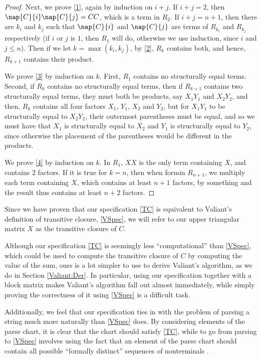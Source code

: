 \begin{proof}
Next, we prove \ref{1}, again by induction on $i + j$. If $i + j = 2$, then $\nap{C}{i}\nap{C}{j} = CC$, which is a term in $R_2$. If $i + j = n + 1$, then there are $k_i$ and $k_j$ such that $\nap{C}{i}$ and $\nap{C}{j}$ are terms of $R_{k_i}$ and $R_{k_j}$ respectively (if $i$ or $j$ is $1$, then $R_1$ will do, otherwise we use induction, since $i$ and $j \le n$). Then if we let $k = \max(k_i,k_j)$, by \ref{2}, $R_k$ contains both, and hence, $R_{k+1}$ contains their product. 

We prove \ref{3} by induction on $k$. First, $R_1$ contains no structurally equal terms. Second, if $R_k$ contains no structurally equal terms, then if $R_{k+1}$ contains two structurally equal terms, they must both be products, say $X_1Y_1$ and $X_2Y_2$, and then, $R_{k}$ contains all four factors $X_1$, $Y_1$, $X_2$ and $Y_2$, but for $X_1Y_1$ to be structurally equal to $X_2Y_2$, their outermost parentheses must be equal, and so we must have that $X_1$ is structurally equal to $X_2$ and $Y_1$ is structurally equal to $Y_2$, since otherwise the placement of the parentheses would be different in the products. 

We prove \ref{4} by induction on $k$. In $R_1$, $XX$ is the only term containing $X$, and contains $2$ factors. If it is true for $k = n$, then when formin $R_{n+1}$, we multiply each term containing $X$, which contains at least $n + 1$ factors, by something and the result thus contains at least $n+2$ factors.
\end{proof}

Since we have proven that our specification \eqref{TC} is equivalent to Valiant's definition of transitive closure, \eqref{VSpec}, we will refer to our upper triangular matrix $X$ as the transitive closure of $C$. 

Although our specification \eqref{TC} is seemingly less ``computational'' than 
\eqref{VSpec}, which could be used to compute the transitive closure of $C$ by computing the value of the sum, ours is a lot simpler to use to derive Valiant's algorithm, as we do in Section \ref{Valiant:Der}. In particular, using our specification together with a block matrix makes Valiant's algorithm fall out almost immediately, while simply proving the correctness of it using \eqref{VSpec} is a difficult task.

Additionally, we feel that our specification ties in with the problem of parsing a string much more naturally than \eqref{VSpec} does. By considering elements of the parse chart, it is clear that the chart should satisfy \eqref{TC}, while to go from parsing to \eqref{VSpec} involves using the fact that an element of the parse chart should contain all possible ``formally distinct'' sequences of nonterminals \citep{Valiant}.

